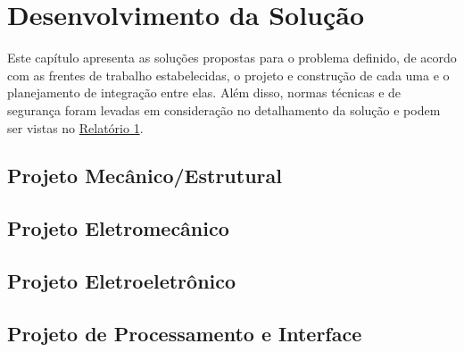 \chapter{Desenvolvimento da Solução}
\label{desenvolvimento}

Este capítulo apresenta as soluções propostas para o problema definido, de acordo com as frentes de trabalho estabelecidas, o projeto
e construção de cada uma e o planejamento de integração entre elas.
Além disso, normas técnicas e de segurança foram levadas em consideração no detalhamento da solução e podem ser vistas no
\href{https://drive.google.com/file/d/0B5InkGKx6O-MR1B3eVYzZFpjQ3c/view?usp=sharing}{Relatório 1}.

\section{Projeto Mecânico/Estrutural}



\section{Projeto Eletromecânico}



\section{Projeto Eletroeletrônico}



\section{Projeto de Processamento e Interface}




